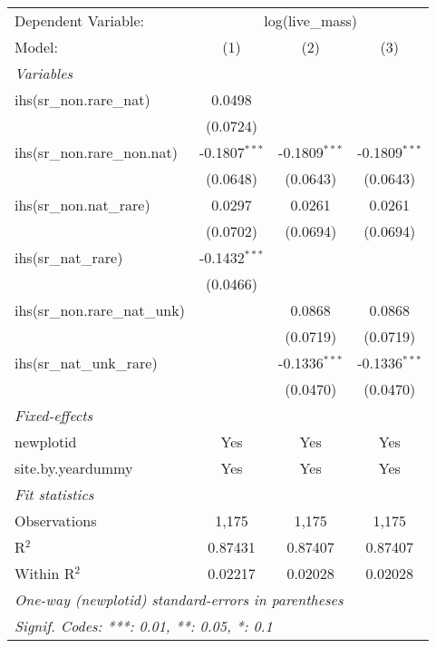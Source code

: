 \begin{tabular}{lccc}
\tabularnewline\midrule\midrule
Dependent Variable:&\multicolumn{3}{c}{log(live\_mass)}\\
Model:&(1) & (2) & (3)\\
\midrule \emph{Variables}&   &   &  \\
ihs(sr\_non.rare\_nat)&0.0498 &    &   \\
  &(0.0724) &    &   \\
ihs(sr\_non.rare\_non.nat)&-0.1807$^{***}$ & -0.1809$^{***}$ & -0.1809$^{***}$\\
  &(0.0648) & (0.0643) & (0.0643)\\
ihs(sr\_non.nat\_rare)&0.0297 & 0.0261 & 0.0261\\
  &(0.0702) & (0.0694) & (0.0694)\\
ihs(sr\_nat\_rare)&-0.1432$^{***}$ &    &   \\
  &(0.0466) &    &   \\
ihs(sr\_non.rare\_nat\_unk)&   & 0.0868 & 0.0868\\
  &   & (0.0719) & (0.0719)\\
ihs(sr\_nat\_unk\_rare)&   & -0.1336$^{***}$ & -0.1336$^{***}$\\
  &   & (0.0470) & (0.0470)\\
\midrule \emph{Fixed-effects}&   &   &  \\
newplotid & Yes & Yes & Yes\\
site.by.yeardummy & Yes & Yes & Yes\\
\midrule \emph{Fit statistics}&  & & \\
Observations & 1,175&1,175&1,175\\
R$^2$ & 0.87431&0.87407&0.87407\\
Within R$^2$ & 0.02217&0.02028&0.02028\\
\midrule\midrule\multicolumn{4}{l}{\emph{One-way (newplotid) standard-errors in parentheses}}\\
\multicolumn{4}{l}{\emph{Signif. Codes: ***: 0.01, **: 0.05, *: 0.1}}\\
\end{tabular}


